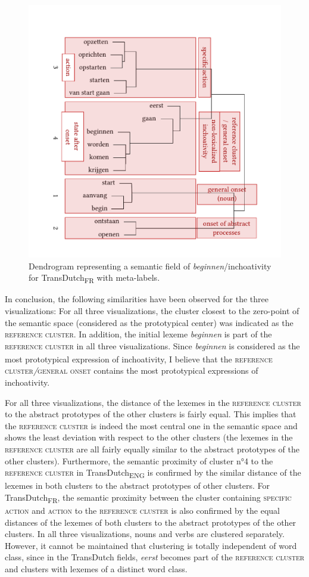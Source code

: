 \begin{figure}
\includegraphics[width=.75\textwidth,trim=0 20 0 50]{figures/tree86.pdf}
\caption{\label{fig:4:83}Dendrogram representing a semantic field of \textit{beginnen}/inchoativity for TransDutch\textsubscript{FR} with meta-labels.}
\end{figure}

In conclusion, the following similarities have been observed for the three visualizations: For all three visualizations, the cluster closest to the zero-point of the semantic space (considered as the prototypical center) was indicated as the \textsc{reference cluster}. In addition, the initial lexeme \textit{beginnen} is part of the \textsc{reference cluster} in all three visualizations.\textsubscript{} Since \textit{beginnen} is considered as the most prototypical expression of inchoativity, I believe that the \textsc{reference cluster}\textit{/}\textsc{general onset} contains the most prototypical expressions of inchoativity. 

For all three visualizations, the distance of the lexemes in the \textsc{reference cluster} to the abstract prototypes of the other clusters is fairly equal. This implies that the \textsc{reference cluster} is indeed the most central one in the semantic space and shows the least deviation with respect to the other clusters (the lexemes in the \textsc{reference cluster} are all fairly equally similar to the abstract prototypes of the other clusters). Furthermore, the semantic proximity of cluster n°4 to the \textsc{reference cluster} in TransDutch\textsubscript{ENG} is confirmed by the similar distance of the lexemes in both clusters to the abstract prototypes of other clusters. For TransDutch\textsubscript{FR}, the semantic proximity between the cluster containing {\textsc{specific}} \textsc{action} and \textsc{action} to the \textsc{reference cluster} is also confirmed by the equal distances of the lexemes of both clusters to the abstract prototypes of the other clusters. In all three visualizations, nouns and verbs are clustered separately. However, it cannot be maintained that clustering is totally independent of word class, since in the TransDutch fields, \textit{eerst} becomes part of the \textsc{reference cluster} and clusters with lexemes of a distinct word class.

